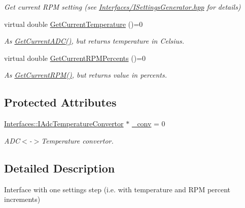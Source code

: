 \begin{DoxyCompactItemize}
\begin{DoxyCompactList}\small\item\em Get current R\+PM setting (see \hyperlink{_i_settings_generator_8hpp_source}{Interfaces/\+I\+Settings\+Generator.\+hpp} for details) \end{DoxyCompactList}\item 
virtual double \hyperlink{class_interfaces_1_1_i_settings_step_a62644690b7b63d27e72eca277a32bfdd}{Get\+Current\+Temperature} ()=0
\begin{DoxyCompactList}\small\item\em As \hyperlink{class_interfaces_1_1_i_settings_step_a54d5ce3350791e080bcb75d472376abf}{Get\+Current\+A\+D\+C()}, but returns temperature in Celsius. \end{DoxyCompactList}\item 
virtual double \hyperlink{class_interfaces_1_1_i_settings_step_abbbb49e91352212c6201a85f1a22253f}{Get\+Current\+R\+P\+M\+Percents} ()=0
\begin{DoxyCompactList}\small\item\em As \hyperlink{class_interfaces_1_1_i_settings_step_ac2b2370bf70fb09a9e1da4db922e8903}{Get\+Current\+R\+P\+M()}, but returns value in percents. \end{DoxyCompactList}\end{DoxyCompactItemize}
\subsection*{Protected Attributes}
\begin{DoxyCompactItemize}
\item 
\mbox{\label{class_interfaces_1_1_i_settings_step_aaa28fcd5fc0d1ed075ad2e274dd5ca01}} 
\hyperlink{class_interfaces_1_1_i_adc_temperature_convertor}{Interfaces\+::\+I\+Adc\+Temperature\+Convertor} $\ast$ \hyperlink{class_interfaces_1_1_i_settings_step_aaa28fcd5fc0d1ed075ad2e274dd5ca01}{\+\_\+conv} = 0
\begin{DoxyCompactList}\small\item\em A\+DC$<$-\/$>$Temperature convertor. \end{DoxyCompactList}\end{DoxyCompactItemize}


\subsection{Detailed Description}
Interface with one settings step (i.\+e. with temperature and R\+PM percent increments) 


